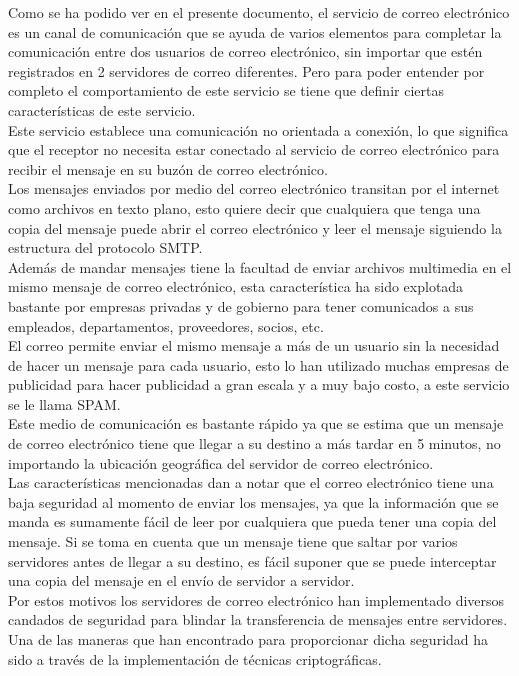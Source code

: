 \documentclass[12pt,oneside,onecolumn,openany]{report}
\begin{document}
Como se ha podido ver en el presente documento, el servicio de correo electrónico es un  canal  de  comunicación  que  se  ayuda  de  varios  elementos  para  completar  la 
comunicación  entre  dos  usuarios  de  correo  electrónico,  sin importar que  estén registrados en 2 servidores de correo diferentes. Pero 
para poder entender por completo el  comportamiento  de  este  servicio  se tiene  que  definir  ciertas  características  de  este servicio. 
\\
Este servicio establece una comunicación no orientada a conexión, lo que significa que el  receptor  no  necesita  estar  conectado  al  servicio  de  correo  electrónico  para  recibir  el mensaje en su buzón de correo electrónico. 
\\
Los mensajes enviados por medio del correo electrónico transitan por el   internet   como archivos  en  texto  plano,  esto  quiere  decir  que  cualquiera  que  tenga  una  copia  del 
mensaje puede abrir el correo            electrónico    y    leer    el    mensaje    siguiendo    la estructura del protocolo SMTP. 
\\
Además  de  mandar  mensajes  tiene  la  facultad  de  enviar  archivos  multimedia  en  el mismo mensaje de correo electrónico, esta característica ha sido explotada bastante por empresas   privadas   y   de   gobierno   para   tener   comunicados   a   sus empleados, departamentos, proveedores, socios, etc. 
\\
El  correo  permite  enviar  el  mismo  mensaje  a  más  de  un  usuario  sin  la  necesidad  de hacer un mensaje para cada usuario, esto lo han       utilizado     muchas     empresas     de 
publicidad para hacer publicidad a gran   escala y a muy bajo costo, a este servicio se le llama SPAM. 
\\
Este  medio  de  comunicación  es  bastante  rápido  ya  que  se  estima  que  un  mensaje  de correo  electrónico  tiene  que  llegar  a  su  destino  a  más  tardar  en  5  minutos,  no 
importando la ubicación geográfica del        servidor de correo electrónico. 
\\
Las características mencionadas  dan a notar que el correo electrónico tiene una baja seguridad al momento de enviar los mensajes, ya que la información que se manda es 
sumamente fácil de leer por cualquiera que pueda tener una copia del mensaje. Si se toma en cuenta que un mensaje tiene que saltar 
por  varios  servidores  antes  de  llegar  a  su  destino,  es  fácil  suponer  que  se puede interceptar una copia del mensaje en el envío de servidor a servidor. 
\\
Por  estos  motivos  los  servidores  de  correo  electrónico  han implementado  diversos candados  de  seguridad  para  blindar  la  transferencia  de  mensajes  entre  servidores.  Una 
de  las  maneras  que  han  encontrado  para  proporcionar  dicha seguridad  ha  sido  a través de la implementación de técnicas criptográficas. 
\\
\end{document}
